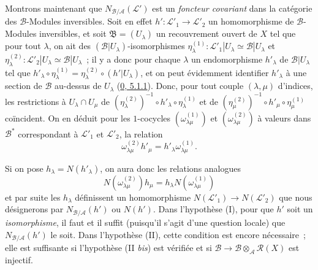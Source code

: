 \begin{env}[6.5.3]
\label{II.6.5.3-fr}
Montrons maintenant que $N_{\mathcal{B}/\mathcal{A}}(\mathcal{L}')$ est un
\emph{foncteur covariant} dans la catégorie des $\mathcal{B}$-Modules
inversibles. Soit en effet $h':\mathcal{L}'_1\to\mathcal{L}'_2$ un
homomorphisme de $\mathcal{B}$-Modules inversibles, et soit
$\mathfrak{B}=(U_\lambda)$ un recouvrement ouvert de $X$ tel que pour tout
$\lambda$, on ait des $(\mathcal{B}|U_\lambda)$-isomorphismes
$\eta^{(1)}_\lambda:\mathcal{L}'_1|U_\lambda\simeq\mathcal{B}|U_\lambda$ et
$\eta^{(2)}_\lambda:\mathcal{L}'_2|U_\lambda\simeq\mathcal{B}|U_\lambda$~;
il y a donc pour chaque $\lambda$ un endomorphisme $h'_\lambda$ de
$\mathcal{B}|U_\lambda$ tel que
$h'_\lambda\circ\eta^{(1)}_\lambda
=\eta^{(2)}_\lambda\circ(h'|U_\lambda)$, et on peut évidemment identifier
$h'_\lambda$ à une section de $\mathcal{B}$ au-dessus de $U_\lambda$
(\hyperref[0.5.1.1-fr]{0, 5.1.1}). Donc, pour tout couple $(\lambda,\mu)$
d'indices, les restrictions à $U_\lambda\cap U_\mu$ de
$(\eta^{(2)}_\lambda)^{-1}\circ h'_\lambda\circ\eta^{(1)}_\lambda$ et de
$(\eta^{(2)}_\mu)^{-1}\circ h'_\mu\circ\eta^{(1)}_\mu$ coïncident. On en
déduit pour les $1$-cocycles $(\omega^{(1)}_{\lambda\mu})$ et
$(\omega^{(2)}_{\lambda\mu})$ à valeurs dans $\mathcal{B}^*$ correspondant à
$\mathcal{L}'_1$ et $\mathcal{L}'_2$, la relation
\[
\omega^{(2)}_{\lambda\mu}h'_\mu
=h'_\lambda\omega^{(1)}_{\lambda\mu}.
\]


Si on pose $h_\lambda=N(h'_\lambda)$, on aura donc les relations analogues
\[
N(\omega^{(2)}_{\lambda\mu})h_\mu
=h_\lambda N(\omega^{(1)}_{\lambda\mu})
\]
et par suite les $h_\lambda$ définissent un homomorphisme
$N(\mathcal{L}'_1)\to N(\mathcal{L}'_2)$ que nous désignerons par
$N_{\mathcal{B}/\mathcal{A}}(h')$ ou $N(h')$. Dans l'hypothèse (I), pour que
$h'$ soit un \emph{isomorphisme}, il faut et il suffit (puisqu'il s'agit d'une
question locale) que $N_{\mathcal{B}/\mathcal{A}}(h')$ le soit. Dans
l'hypothèse (II), cette condition est encore nécessaire~; elle est suffisante
si l'hypothèse (II \emph{bis}) est vérifiée et si
$\mathcal{B}\to\mathcal{B}\otimes_{\mathcal{A}}\mathcal{R}(X)$ est injectif.


\end{env}
